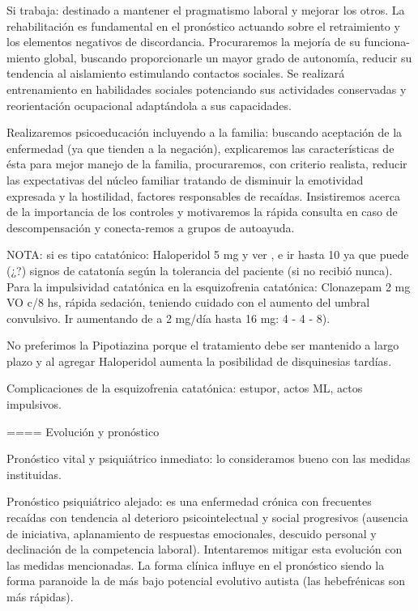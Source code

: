 Si trabaja: destinado a mantener el pragmatismo laboral y mejorar los otros. La rehabilitación es fundamental en el pronóstico actuando sobre el retraimiento y los elementos negativos de discordancia. Procuraremos la mejoría de su funciona-miento global, buscando proporcionarle un mayor grado de autonomía, reducir su tendencia al aislamiento estimulando contactos sociales. Se realizará entrenamiento en habilidades sociales potenciando sus actividades conservadas y reorientación ocupacional adaptándola a sus capacidades.

Realizaremos psicoeducación incluyendo a la familia: buscando aceptación de la enfermedad (ya que tienden a la negación), explicaremos las características de ésta para mejor manejo de la familia, procuraremos, con criterio realista, reducir las expectativas del núcleo familiar tratando de disminuir la emotividad expresada y la hostilidad, factores responsables de recaídas. Insistiremos acerca de la importancia de los controles y motivaremos la rápida consulta en caso de descompensación y conecta-remos a grupos de autoayuda.

NOTA: si es tipo catatónico: Haloperidol 5 mg y ver , e ir hasta 10 ya que puede (¿?) signos de catatonía según la tolerancia del paciente (si no recibió nunca). Para la impulsividad catatónica en la esquizofrenia catatónica: Clonazepam 2 mg VO c/8 hs, rápida sedación, teniendo cuidado con el aumento del umbral convulsivo. Ir aumentando de a 2 mg/día hasta 16 mg: 4 - 4 - 8).

No preferimos la Pipotiazina porque el tratamiento debe ser mantenido a largo plazo y al agregar Haloperidol aumenta la posibilidad de disquinesias tardías.

Complicaciones de la esquizofrenia catatónica: estupor, actos ML, actos impulsivos.

==== Evolución y pronóstico

Pronóstico vital y psiquiátrico inmediato: lo consideramos bueno con las medidas instituidas.

Pronóstico psiquiátrico alejado: es una enfermedad crónica con frecuentes recaídas con tendencia al deterioro psicointelectual y social progresivos (ausencia de iniciativa, aplanamiento de respuestas emocionales, descuido personal y declinación de la competencia laboral). Intentaremos mitigar esta evolución con las medidas mencionadas. La forma clínica influye en el pronóstico siendo la forma paranoide la de más bajo potencial evolutivo autista (las hebefrénicas son más rápidas).

